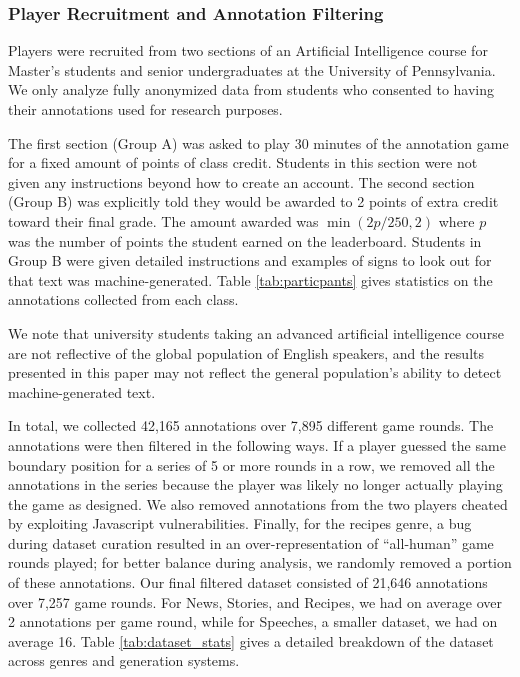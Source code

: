 
\subsubsection{Player Recruitment and Annotation Filtering}
\label{sec:players}
Players were recruited from two sections of an Artificial Intelligence course for Master's students and senior undergraduates at the University of Pennsylvania.
We only analyze fully anonymized data from students who consented to having their annotations used for research purposes.

The first section (Group A) was asked to play 30 minutes of the \ROFT{} annotation game for a fixed amount of points of class credit.
Students in this section were not given any instructions beyond how to create an account.
The second section (Group B) was explicitly told they would be awarded to 2 points of extra credit toward their final grade.
The amount awarded was $\min(2p/250, 2)$ where $p$ was the number of points the student earned on the \ROFT{} leaderboard.
Students in Group B were given detailed instructions and examples of signs to look out for that text was machine-generated.
Table \ref{tab:particpants} gives statistics on the annotations collected from each class.

We note that university students taking an advanced artificial intelligence course are not reflective of the global population of English speakers, and the results presented in this paper may not reflect the general population's ability to detect machine-generated text. 

In total, we collected 42,165 annotations over 7,895 different game rounds.
The annotations were then filtered in the following ways.
If a player guessed the same boundary position for a series of 5 or more rounds in a row, we removed all the annotations in the series because the player was likely no longer actually playing the game as designed.
We also removed annotations from the two players cheated by exploiting Javascript vulnerabilities.
Finally, for the recipes genre, a bug during dataset curation resulted in an over-representation of ``all-human'' game rounds played;
for better balance during analysis, we randomly removed a portion of these annotations.
Our final filtered dataset consisted of 21,646 annotations over 7,257 game rounds.
For News, Stories, and Recipes, we had on average over 2 annotations per game round, while for Speeches, a smaller dataset, we had on average 16.
Table \ref{tab:dataset_stats} gives a detailed breakdown of the dataset across genres and generation systems.


